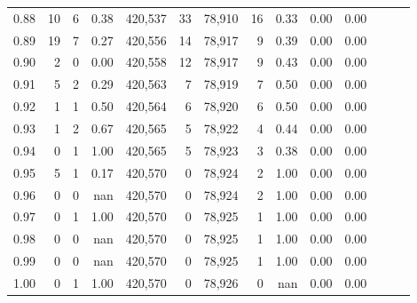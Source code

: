 \begin{tabular}{rrrrrrrrrrrrrr}
0.88 &      10 &      6 &  0.38 &  420,537 &       33 &  78,910 &      16 &  0.33 &  0.00 &      0.00 \\
0.89 &      19 &      7 &  0.27 &  420,556 &       14 &  78,917 &       9 &  0.39 &  0.00 &      0.00 \\
0.90 &       2 &      0 &  0.00 &  420,558 &       12 &  78,917 &       9 &  0.43 &  0.00 &      0.00 \\
0.91 &       5 &      2 &  0.29 &  420,563 &        7 &  78,919 &       7 &  0.50 &  0.00 &      0.00 \\
0.92 &       1 &      1 &  0.50 &  420,564 &        6 &  78,920 &       6 &  0.50 &  0.00 &      0.00 \\
0.93 &       1 &      2 &  0.67 &  420,565 &        5 &  78,922 &       4 &  0.44 &  0.00 &      0.00 \\
0.94 &       0 &      1 &  1.00 &  420,565 &        5 &  78,923 &       3 &  0.38 &  0.00 &      0.00 \\
0.95 &       5 &      1 &  0.17 &  420,570 &        0 &  78,924 &       2 &  1.00 &  0.00 &      0.00 \\
0.96 &       0 &      0 &   nan &  420,570 &        0 &  78,924 &       2 &  1.00 &  0.00 &      0.00 \\
0.97 &       0 &      1 &  1.00 &  420,570 &        0 &  78,925 &       1 &  1.00 &  0.00 &      0.00 \\
0.98 &       0 &      0 &   nan &  420,570 &        0 &  78,925 &       1 &  1.00 &  0.00 &      0.00 \\
0.99 &       0 &      0 &   nan &  420,570 &        0 &  78,925 &       1 &  1.00 &  0.00 &      0.00 \\
1.00 &       0 &      1 &  1.00 &  420,570 &        0 &  78,926 &       0 &   nan &  0.00 &      0.00 \\
\bottomrule
\end{tabular}
